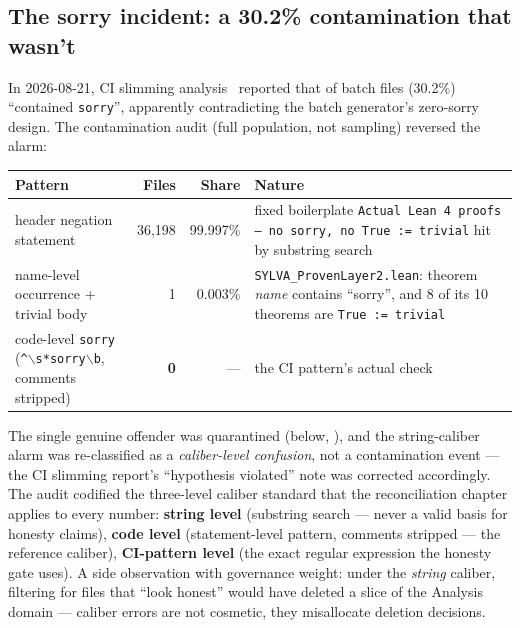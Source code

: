\subsection{The sorry incident: a 30.2\% contamination that
wasn't}
\label{sec:sorry}
In 2026-08-21, CI slimming analysis~\cite{sylvacislim2026} reported
that  of
 batch files (30.2\%) ``contained \texttt{sorry}'',
apparently contradicting the batch generator's zero-sorry design.
The contamination audit (full population, not sampling) reversed
the alarm:

\begin{center}
\small
\begin{tabular}{@{}p{5.4cm}rrp{5.8cm}@{}}
\toprule
Pattern & Files & Share & Nature \\
\midrule
header negation statement & 36{,}198 & 99.997\% & fixed boilerplate
\texttt{Actual Lean 4 proofs --- no sorry, no True := trivial}
hit by substring search \\
name-level occurrence + trivial body & 1 & 0.003\% &
\texttt{SYLVA\_ProvenLayer2.lean}: theorem \emph{name} contains
``sorry'', and 8 of its 10 theorems are \texttt{True :=
trivial} \\
\midrule
code-level \texttt{sorry} (\texttt{\^{}$\backslash$s*sorry$\backslash$b},
comments stripped) & \textbf{0} & --- & the CI pattern's actual
check \\
\bottomrule
\end{tabular}
\end{center}

The single genuine offender was quarantined (below,
\cite{sylvaquarantine2026}), and the
string-caliber alarm was re-classified as a \emph{caliber-level
confusion}, not a contamination event --- the CI slimming report's
``hypothesis violated'' note was corrected accordingly. The audit
codified the three-level caliber standard that the reconciliation
chapter applies to every number: \textbf{string level} (substring
search --- never a valid basis for honesty claims),
\textbf{code level} (statement-level pattern, comments stripped
--- the reference caliber), \textbf{CI-pattern level} (the exact
regular expression the honesty gate uses). A side observation
with governance weight: under the \emph{string} caliber, filtering
for files that ``look honest'' would have deleted a
 slice of the Analysis domain --- caliber errors
are not cosmetic, they misallocate deletion decisions.

